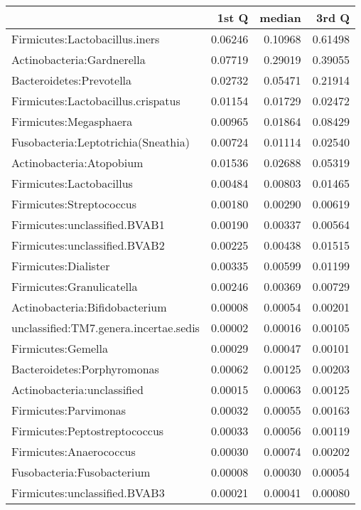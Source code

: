 \documentclass[11pt]{article}\usepackage[]{graphicx}\usepackage[]{color}
\begin{document}
\begin{table}[ht]
\centering
\begin{tabular}{lrrr}
  \hline
 & 1st Q & median & 3rd Q \\ 
  \hline
Firmicutes:Lactobacillus.iners & 0.06246 & 0.10968 & 0.61498 \\ 
  Actinobacteria:Gardnerella & 0.07719 & 0.29019 & 0.39055 \\ 
  Bacteroidetes:Prevotella & 0.02732 & 0.05471 & 0.21914 \\ 
  Firmicutes:Lactobacillus.crispatus & 0.01154 & 0.01729 & 0.02472 \\ 
  Firmicutes:Megasphaera & 0.00965 & 0.01864 & 0.08429 \\ 
  Fusobacteria:Leptotrichia(Sneathia) & 0.00724 & 0.01114 & 0.02540 \\ 
  Actinobacteria:Atopobium & 0.01536 & 0.02688 & 0.05319 \\ 
  Firmicutes:Lactobacillus & 0.00484 & 0.00803 & 0.01465 \\ 
  Firmicutes:Streptococcus & 0.00180 & 0.00290 & 0.00619 \\ 
  Firmicutes:unclassified.BVAB1 & 0.00190 & 0.00337 & 0.00564 \\ 
  Firmicutes:unclassified.BVAB2 & 0.00225 & 0.00438 & 0.01515 \\ 
  Firmicutes:Dialister & 0.00335 & 0.00599 & 0.01199 \\ 
  Firmicutes:Granulicatella & 0.00246 & 0.00369 & 0.00729 \\ 
  Actinobacteria:Bifidobacterium & 0.00008 & 0.00054 & 0.00201 \\ 
  unclassified:TM7.genera.incertae.sedis & 0.00002 & 0.00016 & 0.00105 \\ 
  Firmicutes:Gemella & 0.00029 & 0.00047 & 0.00101 \\ 
  Bacteroidetes:Porphyromonas & 0.00062 & 0.00125 & 0.00203 \\ 
  Actinobacteria:unclassified & 0.00015 & 0.00063 & 0.00125 \\ 
  Firmicutes:Parvimonas & 0.00032 & 0.00055 & 0.00163 \\ 
  Firmicutes:Peptostreptococcus & 0.00033 & 0.00056 & 0.00119 \\ 
  Firmicutes:Anaerococcus & 0.00030 & 0.00074 & 0.00202 \\ 
  Fusobacteria:Fusobacterium & 0.00008 & 0.00030 & 0.00054 \\ 
  Firmicutes:unclassified.BVAB3 & 0.00021 & 0.00041 & 0.00080 \\ 

\end{tabular}
\end{table}
\end{document}

